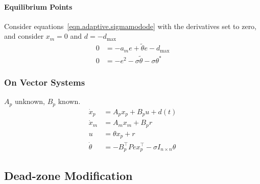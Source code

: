 \paragraph{Equilibrium Points}
Consider equations~\eqref{eqn.adaptive.sigmamodode} with the derivatives set to zero, and consider $x_{m}=0$ and $d=-d_{\text{max}}$
\begin{align*}
0&=-a_{m}e+\tilde{\theta}e-d_{\text{max}} \\
0&=-e^{2}-\sigma\tilde{\theta}-\sigma\theta^{*}
\end{align*}

\subsubsection{On Vector Systems}

$A_{p}$ unknown, $B_{p}$ known.
\begin{align*}
  \dot{x}_{p}&=A_{p}x_{p}+B_{p}u+d(t) \\
  \dot{x}_{m}&=A_{m}x_{m}+B_{p}r \\
  u&=\theta x_{p}+r \\
  \dot{\theta}&=-B_{p}^{\top}Pex_{p}^{\top}-\sigma I_{n\times n}\theta
\end{align*}



\subsection{Dead-zone Modification}

